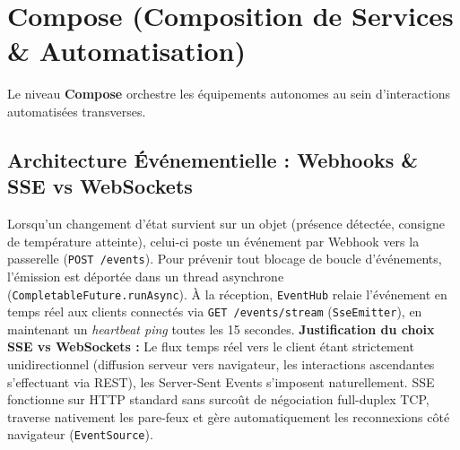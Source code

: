 \documentclass[10pt,a4paper]{article}
\begin{document}
\section{Compose (Composition de Services \& Automatisation)}
Le niveau \textbf{Compose} orchestre les équipements autonomes au sein d'interactions automatisées transverses.

\subsection{Architecture Événementielle : Webhooks \& SSE vs WebSockets}
Lorsqu'un changement d'état survient sur un objet (présence détectée, consigne de température atteinte), celui-ci poste un événement par Webhook vers la passerelle (\texttt{POST /events}). Pour prévenir tout blocage de boucle d'événements, l'émission est déportée dans un thread asynchrone (\texttt{CompletableFuture.runAsync}).
À la réception, \texttt{EventHub} relaie l'événement en temps réel aux clients connectés via \texttt{GET /events/stream} (\texttt{SseEmitter}), en maintenant un \emph{heartbeat ping} toutes les 15 secondes.
\textbf{Justification du choix SSE vs WebSockets :} Le flux temps réel vers le client étant strictement unidirectionnel (diffusion serveur vers navigateur, les interactions ascendantes s'effectuant via REST), les Server-Sent Events s'imposent naturellement. SSE fonctionne sur HTTP standard sans surcoût de négociation full-duplex TCP, traverse nativement les pare-feux et gère automatiquement les reconnexions côté navigateur (\texttt{EventSource}).
\end{document}
